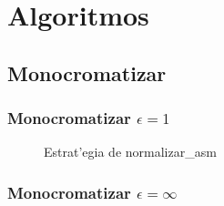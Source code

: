\section{Algoritmos}
\subsection{Monocromatizar}
\subsubsection{Monocromatizar $\epsilon = 1$ }

\begin{figure}[hb]
\caption{Estrat'egia de normalizar\_asm}
\label{est:m-uno}
\end{figure}


\subsubsection{Monocromatizar $\epsilon = \infty $ }
